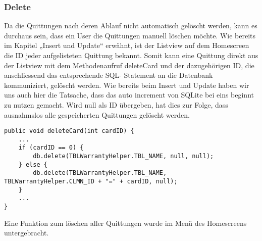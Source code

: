 \subsubsection{Delete}
Da die Quittungen nach deren Ablauf nicht automatisch gelöscht werden, kann es durchaus sein, dass ein User die Quittungen manuell löschen möchte. 
Wie bereits im Kapitel „Insert und Update“ erwähnt, ist der Listview auf dem Homescreen die ID jeder aufgelisteten Quittung bekannt. Somit kann eine Quittung direkt aus der Listview mit dem Methodenaufruf deleteCard und der dazugehörigen ID, die anschliessend das entsprechende SQL- Statement an die Datenbank kommuniziert, gelöscht werden.
\newline
Wie bereits beim Insert und Update haben wir uns auch hier die Tatsache, dass das auto increment von SQLite bei eins beginnt zu nutzen gemacht. Wird null als ID übergeben, hat dies zur Folge, dass ausnahmslos alle gespeicherten Quittungen gelöscht werden.

\begin{lstlisting}[caption=deleteCard Methode,captionpos=b,lang=java]
public void deleteCard(int cardID) {
	...
	if (cardID == 0) {
		db.delete(TBLWarrantyHelper.TBL_NAME, null, null);
	} else {
		db.delete(TBLWarrantyHelper.TBL_NAME, TBLWarrantyHelper.CLMN_ID + "=" + cardID, null);
	}
	...
}
\end{lstlisting}
Eine Funktion zum löschen aller Quittungen wurde im Menü des Homescreens untergebracht.